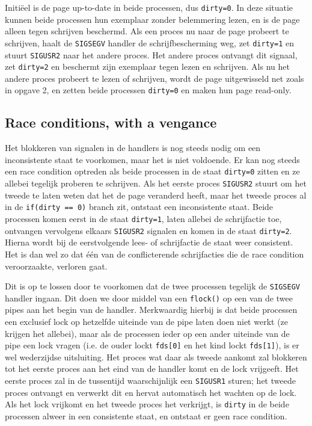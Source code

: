 \documentclass[11pt]{article}
\begin{document}
Initi\"eel is de page up-to-date in beide processen, dus \verb+dirty=0+. In deze situatie kunnen
beide processen hun exemplaar zonder belemmering lezen, en is de page alleen tegen schrijven beschermd.
Als een proces nu naar de page probeert te schrijven, haalt de \verb+SIGSEGV+ handler de schrijfbescherming
weg, zet \verb+dirty=1+ en stuurt \verb+SIGUSR2+ naar het andere proces. Het andere proces ontvangt dit signaal,
zet \verb+dirty=2+ en beschermt zijn exemplaar tegen lezen en schrijven. Als nu het andere proces probeert
te lezen of schrijven, wordt de page uitgewisseld net zoals in opgave 2, en zetten beide processen \verb+dirty=0+
en maken hun page read-only.

\subsection*{Race conditions, with a vengance}
Het blokkeren van signalen in de handlers is nog steeds nodig om een inconsistente staat te voorkomen, maar het
is niet voldoende. Er kan nog steeds een race condition optreden als beide processen in de staat \verb+dirty=0+
zitten en ze allebei tegelijk proberen te schrijven. Als het eerste proces \verb+SIGUSR2+ stuurt om het tweede
te laten weten dat het de page veranderd heeft, maar het tweede proces al in de \verb+if(dirty == 0)+ branch
zit, ontstaat een inconsistente staat. Beide processen komen eerst in de staat \verb+dirty=1+, laten
allebei de schrijfactie toe, ontvangen vervolgens elkaars \verb+SIGUSR2+ signalen en komen in de staat
\verb+dirty=2+. Hierna wordt bij de eerstvolgende lees- of schrijfactie de staat weer consistent. Het is
dan wel zo dat \'e\'en van de conflicterende schrijfacties die de race condition veroorzaakte, verloren gaat.

Dit is op te lossen door te voorkomen dat de twee processen tegelijk de \verb+SIGSEGV+ handler ingaan.
Dit doen we door middel van een \verb+flock()+ op een van de twee pipes aan het begin van de handler.
Merkwaardig hierbij is dat beide processen een exclusief lock op hetzelfde uiteinde van de pipe laten doen
niet werkt (ze krijgen het allebei), maar als de processen ieder op een ander uiteinde van de pipe een lock
vragen (i.e. de ouder lockt \verb+fds[0]+ en het kind lockt \verb+fds[1]+), is er wel wederzijdse uitsluiting.
Het proces wat daar als tweede aankomt zal blokkeren tot het eerste proces aan het eind van de handler
komt en de lock vrijgeeft. Het eerste proces zal in de tussentijd waarschijnlijk een \verb+SIGUSR1+ sturen;
het tweede proces ontvangt en verwerkt dit en hervat automatisch het wachten op de lock. Als het lock vrijkomt
en het tweede proces het verkrijgt, is \verb+dirty+ in de beide processen alweer in een consistente staat,
en ontstaat er geen race condition.
\end{document}
